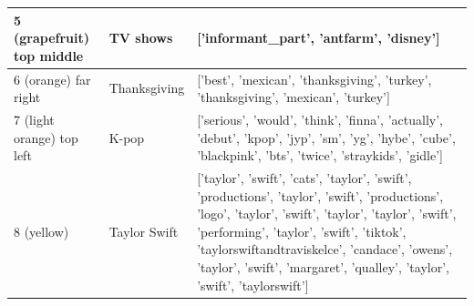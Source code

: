 \documentclass{article}
\begin{document}
\begin{table}[h!]
\begin{tabular}{|p{4cm}|p{2cm}|p{8cm}|}
        \hline 
        
        5 (grapefruit) top middle & TV shows & ['informant\_part', 'antfarm', 'disney'] \\

        \hline

        6 (orange) far right &  Thanksgiving & ['best', 'mexican', 'thanksgiving', 'turkey', 'thanksgiving', 'mexican', 'turkey'] \\

        \hline
        7 (light orange) top left & K-pop & ['serious', 'would', 'think', 'finna', 'actually', 'debut', 'kpop', 'jyp', 'sm', 'yg', 'hybe', 'cube', 'blackpink', 'bts', 'twice', 'straykids', 'gidle'] \\

        \hline

        8 (yellow) & Taylor Swift & ['taylor', 'swift', 'cats', 'taylor', 'swift', 'productions', 'taylor', 'swift', 'productions', 'logo', 'taylor', 'swift', 'taylor', 'taylor', 'swift', 'performing', 'taylor', 'swift', 'tiktok', 'taylorswiftandtraviskelce', 'candace', 'owens', 'taylor', 'swift', 'margaret', 'qualley', 'taylor', 'swift', 'taylorswift']\\

        \hline
    \end{tabular}
\end{table}


\newpage 


\end{document}

